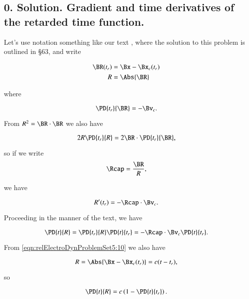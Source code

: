 \subsection{0. Solution.  Gradient and time derivatives of the retarded time function.}

Let's use notation something like our text \citep{landau1980classical}, where the solution to this problem is outlined in \S 63, and write

\begin{align}\label{eqn:relElectroDynProblemSet5:70}
\BR(t_r) &= \Bx - \Bx_c(t_r) \\
R &= \Abs{\BR}
\end{align}

where

\begin{equation}\label{eqn:relElectroDynProblemSet5:90}
\PD{t_r}{\BR} = - \Bv_c.
\end{equation}

From $R^2 = \BR \cdot \BR$ we also have

\begin{equation}\label{eqn:relElectroDynProblemSet5:110}
2 R \PD{t_r}{R} = 2 \BR \cdot \PD{t_r}{\BR},
\end{equation}

so if we write
\begin{equation}\label{eqn:relElectroDynProblemSet5:130}
\Rcap = \frac{\BR}{R},
\end{equation}

we have

\begin{equation}\label{eqn:relElectroDynProblemSet5:150}
R'(t_r) = -\Rcap \cdot \Bv_c.
\end{equation}

Proceeding in the manner of the text, we have

\begin{equation}\label{eqn:relElectroDynProblemSet5:170}
\PD{t}{R} = \PD{t_r}{R} \PD{t}{t_r} = -\Rcap \cdot \Bv_c \PD{t}{t_r}.
\end{equation}

From \ref{eqn:relElectroDynProblemSet5:10} we also have

\begin{equation}\label{eqn:relElectroDynProblemSet5:200}
R = \Abs{\Bx - \Bx_c(t_r)} = c(t - t_r),
\end{equation}

so 

\begin{equation}\label{eqn:relElectroDynProblemSet5:220}
\PD{t}{R} = c\left(1 - \PD{t}{t_r}\right).
\end{equation}

